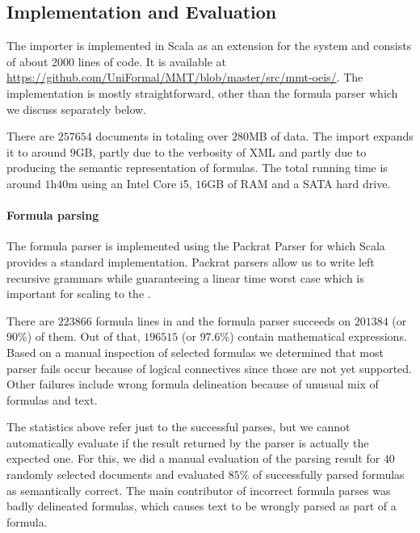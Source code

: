\subsection{Implementation and Evaluation}
The importer is implemented in Scala as an extension for the \mmt system and consists of
about 2000 lines of code.  It is available at
\url{https://github.com/UniFormal/MMT/blob/master/src/mmt-oeis/}. The implementation is
mostly straightforward, other than the formula parser which we discuss separately below.

There are $257654$ documents in \oeis totaling over $280$MB of data. The \omdmmt import expands it to around
$9$GB,
partly due to the verbosity of XML and partly due to producing the semantic representation of formulas.
The total running time is around $1$h$40$m  using an Intel Core i5, $16$GB of RAM and a SATA hard drive.

\paragraph{Formula parsing} The formula parser is implemented using the Packrat Parser \cite{packrat} for which Scala
provides a standard implementation. Packrat parsers allow us to write left recursive grammars while guaranteeing a
linear time worst case which is important for scaling to the \oeis.

 There are $223866$ formula lines in \oeis and the formula parser succeeds on $201384$ (or
$90\%$) of them. Out of that, $196515$ (or $97.6\%$) contain mathematical expressions.
Based on a manual inspection of selected formulas we determined that most parser fails occur because of
logical connectives since those are not yet supported. Other failures include
wrong formula delineation because of unusual mix of formulas and text.

The statistics above refer just to the successful parses, but we cannot automatically evaluate if the result
returned by the parser is actually the expected one. For this, we did a manual evaluation of the parsing result for
$40$ randomly selected \oeis documents and evaluated $85$\% of successfully
parsed formulas as semantically correct. The main contributor of incorrect formula parses was badly delineated
formulas, which causes text to be wrongly parsed as part of a formula.


